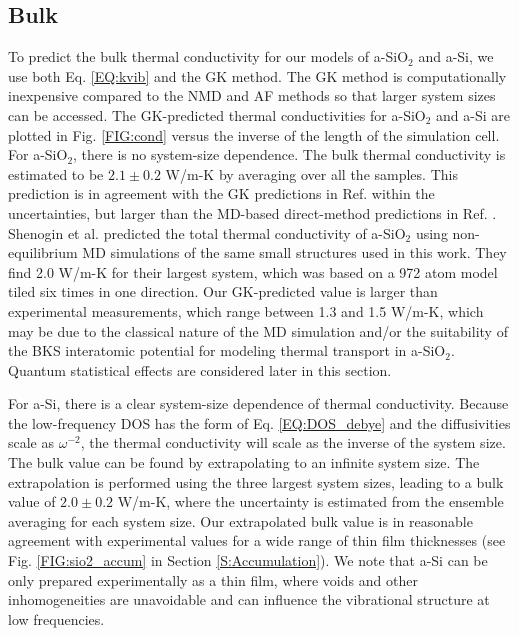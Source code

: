 \documentclass[aps,prb,twocolumn,superscriptaddress,footinbib,amsmath,amssymb,floatfix]{revtex4}
\begin{document}
\subsection{\label{S:Bulk}Bulk}

To predict the bulk thermal conductivity for our models of a-SiO$_2$ and 
a-Si, we use both Eq. \eqref{EQ:kvib} and the GK method. The GK method 
is computationally inexpensive compared to the NMD and AF methods so that 
larger system sizes can be accessed. The GK-predicted thermal 
conductivities for a-SiO$_2$ and a-Si are plotted in Fig. \ref{FIG:cond} 
versus the inverse of the length of the simulation cell. For a-SiO$_2$, 
there is no system-size dependence.  The bulk thermal conductivity is 
estimated to be $2.1 \pm 0.2$ W/m-K by averaging over all the samples. 
This prediction is in agreement with the GK predictions in Ref. 
 within the uncertainties, 
but larger than the MD-based direct-method predictions in Ref. 
. 
Shenogin et al. predicted the total thermal 
conductivity of a-SiO$_2$ using 
non-equilibrium MD simulations of the same small structures 
used in this work.\cite{shenogin_predicting_2009} 
They find 2.0 W/m-K for their largest system, which was based on a 
972 atom model tiled six times in one direction. 
Our GK-predicted value is larger than experimental 
measurements, which range between 
1.3 and 1.5 W/m-K,
\cite{cahill_lattice_1988,lee_heat_1997,
yamane_measurement_2002,regner_broadband_2013} 
which may be due to the classical nature of the MD simulation 
and/or the suitability of the BKS interatomic potential 
for modeling thermal transport in a-SiO$_2$.
\cite{jund_molecular-dynamics_1999,mcgaughey_thermal_2004}
Quantum statistical effects are considered later in this section. 

For a-Si, there is a clear system-size dependence of thermal 
conductivity. 
Because the low-frequency DOS has the form of Eq. \eqref{EQ:DOS_debye} 
and the diffusivities scale as $\omega^{-2}$,  
the thermal conductivity will scale as the inverse of the system size. 
The bulk value can be found by extrapolating to an infinite system size.
\cite{shiomi_thermal_2011,esfarjani_heat_2011,larkin_comparison_2012} 
The extrapolation is performed using the three largest 
system sizes,\cite{mfp_fn2} leading to a bulk value 
of $2.0 \pm 0.2$ W/m-K, where the uncertainty is 
estimated from the ensemble averaging for each system size. 
Our extrapolated bulk value 
is in reasonable agreement with experimental values for a wide 
range of thin film thicknesses (see Fig. \ref{FIG:sio2_accum} in 
Section \ref{S:Accumulation}). 
We note that a-Si can be only prepared experimentally as a thin film, 
where voids and other inhomogeneities are unavoidable
\cite{vacher_attenuation_1980,feldman_thermal_1993,liu_high_2009,
yang_anomalously_2010,li_effect_2011} and can influence the 
vibrational structure at low frequencies.
\end{document}
